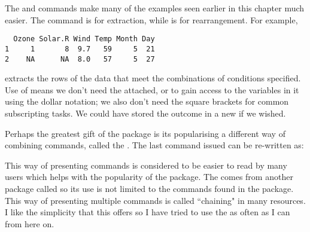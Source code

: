 The  and  commands make many of the examples seen earlier in this chapter much easier. The  command is for extraction, while  is for rearrangement. For example, 
\begin{knitrout}
\color{fgcolor}\begin{kframe}
\begin{alltt}
\hlstd{> }\hlopt{<}\hlopt{&}\hlopt{<}\hlstd{)}
\end{alltt}
\begin{verbatim}
  Ozone Solar.R Wind Temp Month Day
1     1       8  9.7   59     5  21
2    NA      NA  8.0   57     5  27
\end{verbatim}
\end{kframe}
\end{knitrout}
extracts the rows of the  data that meet the combinations of conditions specified.  
Use of  means we don't need the  attached, or to gain access to the variables in it using the dollar notation; we also don't need the square brackets for common subscripting tasks. We could have stored the outcome in a new  if we wished. 
 
Perhaps the greatest gift of the  package is its popularising a different way of combining commands, called the . The last command issued can be re-written as: 
\begin{knitrout}
\color{fgcolor}
\end{knitrout}
This way of presenting commands is considered to be easier to read by many users which helps with the popularity of the   package. The  comes from another package called  so its use is not limited to the commands found in the  package.  
This way of presenting multiple commands is called ``chaining" in many resources. I like the simplicity that this offers so I have tried to use the  as often as I can from here on. 
  
